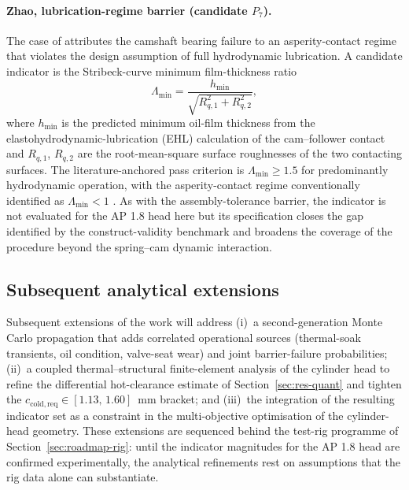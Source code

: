 \paragraph{Zhao, lubrication-regime barrier (candidate $P_{7}$).}
The case of \citet{zhao2023camshaftV6} attributes the camshaft
bearing failure to an asperity-contact regime that violates the
design assumption of full hydrodynamic lubrication. A candidate
indicator is the Stribeck-curve minimum film-thickness ratio
\begin{equation}
\Lambda_{\min}=\frac{h_{\min}}{\sqrt{R_{q,1}^{2}+R_{q,2}^{2}}},
\label{eq:stribeck}
\end{equation}
where $h_{\min}$ is the predicted minimum oil-film thickness from
the elastohydrodynamic-lubrication (EHL) calculation of the
cam--follower contact and $R_{q,1}$, $R_{q,2}$ are the root-mean-square
surface roughnesses of the two contacting surfaces. The
literature-anchored pass criterion is $\Lambda_{\min}\geq 1.5$ for
predominantly hydrodynamic operation, with the asperity-contact
regime conventionally identified as $\Lambda_{\min}<1$
\citep[\S~12-13]{shigley2020}. As with the assembly-tolerance
barrier, the indicator is not evaluated for the AP 1.8 head here
but its specification closes the gap identified by the
construct-validity benchmark and broadens the coverage of the
procedure beyond the spring--cam dynamic interaction.

\subsection{Subsequent analytical extensions}\label{sec:roadmap-extensions}

Subsequent extensions of the work will address (i)~a
second-generation Monte Carlo propagation that adds correlated
operational sources (thermal-soak transients, oil condition,
valve-seat wear) and joint barrier-failure probabilities; (ii)~a
coupled thermal--structural finite-element analysis of the cylinder
head to refine the differential hot-clearance estimate of
Section~\ref{sec:res-quant} and tighten the
$c_{\mathrm{cold,req}}\in [1.13,\,1.60]$~mm bracket; and (iii)~the
integration of the resulting indicator set as a constraint in the
multi-objective optimisation of the cylinder-head geometry. These
extensions are sequenced behind the test-rig programme of
Section~\ref{sec:roadmap-rig}: until the indicator magnitudes for
the AP 1.8 head are confirmed experimentally, the analytical
refinements rest on assumptions that the rig data alone can
substantiate.
